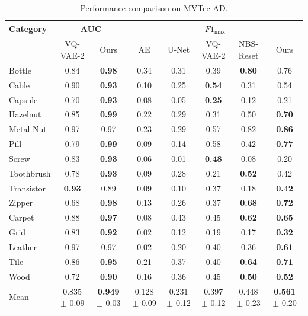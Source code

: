 \documentclass[twoside]{article}
\begin{document}
\begin{table}[h]
	\begin{center}
		\scriptsize
		\caption{Performance comparison on MVTec AD.}\label{tab:combined}
		\begin{tabular}{|l|c|c|c|c|c|c|c|}
			\hline
			Category & \multicolumn{2}{c|}{AUC} & \multicolumn{5}{c|}{\(F1_{\text{max}}\)} \\ \hline
			& VQ-VAE-2 & Ours & AE & U-Net & VQ-VAE-2 & NBS-Reset & Ours \\ \hline \hline
			Bottle & 0.84 & \textbf{0.98} & 0.34 & 0.31 & 0.39 & \textbf{0.80} & 0.76 \\
			Cable & 0.90 & \textbf{0.93} & 0.10 & 0.25 & \textbf{0.54} & 0.31 & 0.54 \\
			Capsule & 0.70 & \textbf{0.93} & 0.08 & 0.05 & \textbf{0.25} & 0.12 & 0.21 \\
			Hazelnut & 0.85 & \textbf{0.99} & 0.22 & 0.29 & 0.31 & 0.50 & \textbf{0.70} \\
			Metal Nut & 0.97 & 0.97 & 0.23 & 0.29 & 0.57 & 0.82 & \textbf{0.86} \\
			Pill & 0.79 & \textbf{0.99} & 0.09 & 0.14 & 0.58 & 0.42 & \textbf{0.77} \\
			Screw & 0.83 & \textbf{0.93} & 0.06 & 0.01 & \textbf{0.48} & 0.08 & 0.20 \\
			Toothbrush & 0.78 & \textbf{0.93} & 0.09 & 0.28 & 0.21 & \textbf{0.52} & 0.42 \\
			Transistor & \textbf{0.93} & 0.89 & 0.09 & 0.10 & 0.37 & 0.18 & \textbf{0.42} \\
			Zipper & 0.68 & \textbf{0.98} & 0.13 & 0.26 & 0.37 & \textbf{0.68} & \textbf{0.72} \\
			Carpet & 0.88 & \textbf{0.97} & 0.08 & 0.43 & 0.45 & \textbf{0.62} & \textbf{0.65} \\
			Grid & 0.83 & \textbf{0.92} & 0.02 & 0.12 & 0.19 & 0.17 & \textbf{0.32} \\
			Leather & 0.97 & 0.97 & 0.02 & 0.20 & 0.40 & 0.36 & \textbf{0.61} \\
			Tile & 0.86 & \textbf{0.95} & 0.21 & 0.37 & 0.40 & \textbf{0.64} & \textbf{0.71} \\
			Wood & 0.72 & \textbf{0.90} & 0.16 & 0.36 & 0.45 & \textbf{0.50} & \textbf{0.52} \\ \hline
			Mean & 0.835 $\pm$ 0.09 & \textbf{0.949} $\pm$ 0.03 & 0.128 $\pm$ 0.09 & 0.231 $\pm$ 0.12 & 0.397 $\pm$ 0.12 & 0.448 $\pm$ 0.23 & \textbf{0.561} $\pm$ 0.20 \\ \hline
		\end{tabular}
	\end{center}
\end{table}
\end{document}
